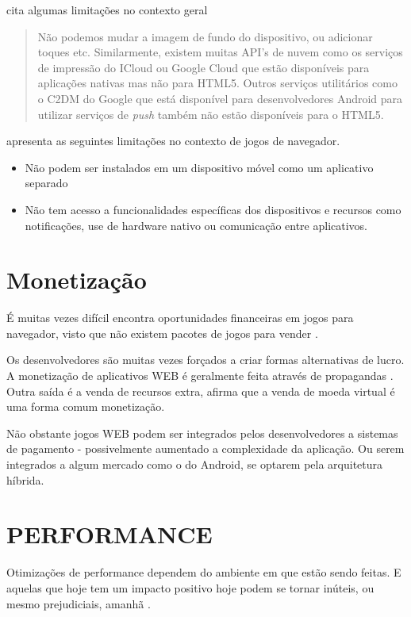 \cite{html5Tradeoffs} cita algumas limitações no contexto geral
\begin{quote}
Não podemos mudar a imagem de fundo do dispositivo, ou adicionar toques
etc. Similarmente, existem muitas API's de nuvem como os serviços
de impressão do ICloud ou Google Cloud que estão disponíveis para
aplicações nativas mas não para HTML5. Outros serviços utilitários
como o C2DM do Google que está disponível para desenvolvedores Android
para utilizar serviços de \textit{push} também não estão disponíveis
para o HTML5.
\end{quote}

\cite{browserGamesTechnologyAndFuture} apresenta as seguintes limitações
no contexto de jogos de navegador.

\begin{itemize}
\item Não podem ser instalados em um dispositivo móvel como um aplicativo separado
\item Não tem acesso a funcionalidades específicas dos dispositivos e recursos como notificações, use de hardware nativo ou comunicação entre aplicativos.
\end{itemize}

\section{Monetização}

É muitas vezes difícil encontra oportunidades financeiras em jogos
para navegador, visto que não existem pacotes de jogos para vender
\autocite[pp. 44]{gameCommunities}.

Os desenvolvedores são muitas vezes forçados a criar formas alternativas
de lucro. A monetização de aplicativos WEB é geralmente feita através de
propagandas \autocite[pp. 44]{gameCommunities}. Outra saída é a venda
de recursos extra, \cite[pp. 44]{gameCommunities} afirma
que a venda de moeda virtual é uma forma comum monetização.

Não obstante jogos WEB podem ser integrados pelos desenvolvedores
a sistemas de pagamento - possivelmente aumentado a complexidade da
aplicação. Ou serem integrados a algum mercado como o do Android, se
optarem pela arquitetura híbrida.

\section{PERFORMANCE}

Otimizações de performance dependem do ambiente em que estão
sendo feitas. E aquelas que hoje tem um impacto positivo hoje
podem se tornar inúteis, ou mesmo prejudiciais, amanhã
\autocite[pp.131]{html5mostwanted}.

